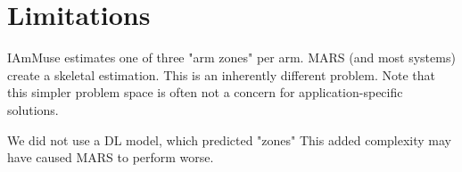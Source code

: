 \section{Limitations}
\label{section: conclusion - limitations}

IAmMuse estimates one of three "arm zones" per arm.
MARS (and most systems) create a skeletal estimation.
This is an inherently different problem.
Note that this simpler problem space is often not a concern for application-specific solutions.

We did not use a DL model, which predicted "zones"
This added complexity may have caused MARS to perform worse.


